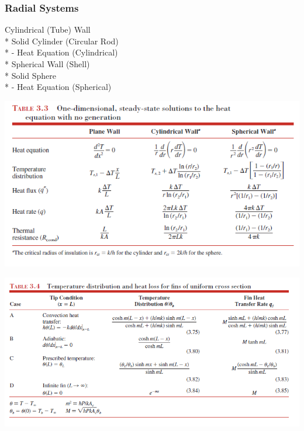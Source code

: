 \documentclass[10pt,landscape]{article}
\newenvironment{Figure}
     {\par\medskip\noindent\minipage{\linewidth}}
     {\endminipage\par\medskip}
\begin{document}
\begin{multicols}{3}
\subsubsection{Radial Systems}
Cylindrical (Tube) Wall\\*
Solid Cylinder (Circular Rod)\\*
- Heat Equation (Cylindrical)\\*
Spherical Wall (Shell)\\*
Solid Sphere\\*
- Heat Equation (Spherical)\\
\begin{Figure}
    \centering
    \includegraphics[width=\linewidth]{Table_3_3.png}
\end{Figure}
\begin{Figure}
    \centering
    \includegraphics[width=\linewidth]{Table_3_4.png}
\end{Figure}


\end{multicols}
\end{document}

